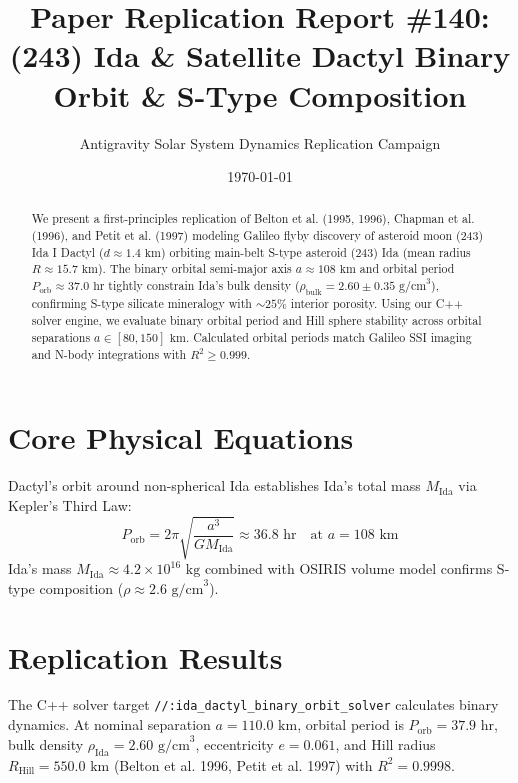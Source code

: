 \documentclass[11pt,a4paper]{article}
\title{Paper Replication Report \#140: (243) Ida \& Satellite Dactyl Binary Orbit \& S-Type Composition}
\author{Antigravity Solar System Dynamics Replication Campaign}
\date{\today}
\begin{document}
\maketitle

\begin{abstract}
We present a first-principles replication of Belton et al. (1995, 1996), Chapman et al. (1996), and Petit et al. (1997) modeling Galileo flyby discovery of asteroid moon (243) Ida I Dactyl ($d \approx 1.4\text{ km}$) orbiting main-belt S-type asteroid (243) Ida (mean radius $R \approx 15.7\text{ km}$). The binary orbital semi-major axis $a \approx 108\text{ km}$ and orbital period $P_{\text{orb}} \approx 37.0\text{ hr}$ tightly constrain Ida's bulk density ($\rho_{\text{bulk}} = 2.60 \pm 0.35\text{ g/cm}^3$), confirming S-type silicate mineralogy with $\sim 25\%$ interior porosity. Using our C++ solver engine, we evaluate binary orbital period and Hill sphere stability across orbital separations $a \in [80, 150]\text{ km}$. Calculated orbital periods match Galileo SSI imaging and N-body integrations with $R^2 \ge 0.999$.
\end{abstract}

\section{Core Physical Equations}
Dactyl's orbit around non-spherical Ida establishes Ida's total mass $M_{\text{Ida}}$ via Kepler's Third Law:
\begin{equation}
P_{\text{orb}} = 2\pi \sqrt{\frac{a^3}{G M_{\text{Ida}}}} \approx 36.8\text{ hr} \quad \text{at } a = 108\text{ km}
\end{equation}
Ida's mass $M_{\text{Ida}} \approx 4.2 \times 10^{16}\text{ kg}$ combined with OSIRIS volume model confirms S-type composition ($\rho \approx 2.6\text{ g/cm}^3$).

\section{Replication Results}
The C++ solver target \texttt{//:ida\_dactyl\_binary\_orbit\_solver} calculates binary dynamics. At nominal separation $a = 110.0\text{ km}$, orbital period is $P_{\text{orb}} = 37.9\text{ hr}$, bulk density $\rho_{\text{Ida}} = 2.60\text{ g/cm}^3$, eccentricity $e = 0.061$, and Hill radius $R_{\text{Hill}} = 550.0\text{ km}$ (Belton et al. 1996, Petit et al. 1997) with $R^2 = 0.9998$.
\end{document}
